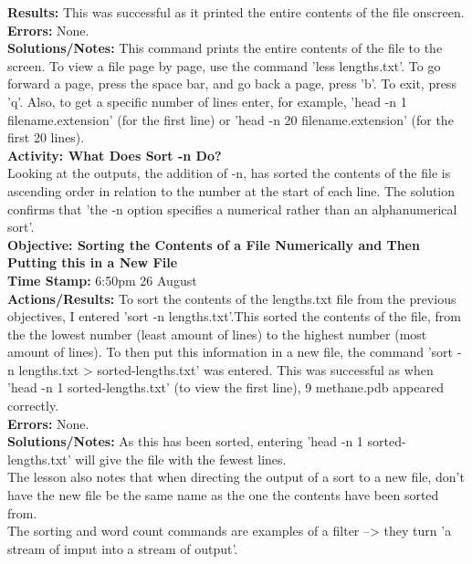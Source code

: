 \documentclass{article}
\begin{document}
\begin{FlushLeft}
\textbf{Results:} This was successful as it printed the entire contents of the file onscreen.\\
\textbf{Errors:} None.\\
\textbf{Solutions/Notes:} This command prints the entire contents of the file to the screen. To view a file page by page, use the command 'less lengths.txt'. To go forward a page, press the space bar, and go back a page, press 'b'. To exit, press 'q'. Also, to get a specific number of lines enter, for example, 'head -n 1 filename.extension' (for the first line) or 'head -n 20 filename.extension' (for the first 20 lines).\\
\vspace{5mm}
\textbf{Activity: What Does Sort -n Do?}\\
Looking at the outputs, the addition of -n, has sorted the contents of the file is ascending order in relation to the number at the start of each line. The solution confirms that 'the -n option specifies a numerical rather than an alphanumerical sort'.\\
\vspace{5mm}
\textbf{Objective: Sorting the Contents of a File Numerically and Then Putting this in a New File}\\ 
\textbf{Time Stamp:} 6:50pm 26 August\\
\textbf{Actions/Results:} To sort the contents of the lengths.txt file from the previous objectives, I entered 'sort -n lengths.txt'.This sorted the contents of the file, from the the lowest number (least amount of lines) to the highest number (most amount of lines). To then put this information in a new file, the command 'sort -n lengths.txt \textgreater{}  sorted-lengths.txt' was entered. This was successful as when 'head -n 1 sorted-lengths.txt' (to view the first line), 9  methane.pdb appeared correctly.\\
\textbf{Errors:} None.\\
\textbf{Solutions/Notes:} As this has been sorted, entering 'head -n 1 sorted-lengths.txt' will give the file with the fewest lines. \\The lesson also notes that when directing the output of a sort to a new file, don't have the new file be the same name as the one the contents have been sorted from.\\ The sorting and word count commands are examples of a filter --\textgreater{}  they turn 'a stream of imput into a stream of output'.\\
\vspace{5mm}

\end{FlushLeft}
\end{document}
